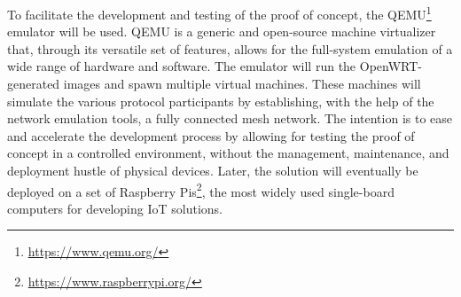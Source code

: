 To facilitate the development and testing of the proof of concept, the QEMU\footnote{\url{https://www.qemu.org/}} emulator will be used. QEMU is a generic and open-source machine virtualizer that, through its versatile set of features, allows for the full-system emulation of a wide range of hardware and software. The emulator will run the OpenWRT-generated images and spawn multiple virtual machines. These machines will simulate the various protocol participants by establishing, with the help of the network emulation tools, a fully connected mesh network. The intention is to ease and accelerate the development process by allowing for testing the proof of concept in a controlled environment, without the management, maintenance, and deployment hustle of physical devices. Later, the solution will eventually be deployed on a set of Raspberry Pis\footnote{\url{https://www.raspberrypi.org/}}, the most widely used single-board computers for developing IoT solutions.
